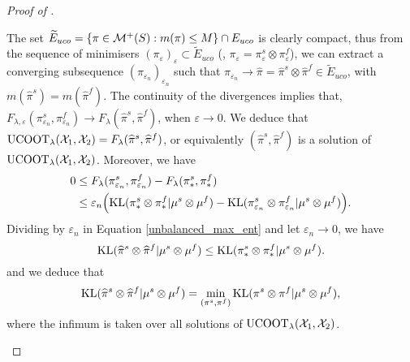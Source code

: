 \begin{proof}[Proof of ]
\begin{enumerate}
    The set $\widetilde{E}_{uco} = \{\pi \in \mathcal M^+(S): m(\pi) \leq M\} \cap E_{uco}$
    is clearly compact, thus from the sequence of minimisers
    $(\pi_{\varepsilon})_{\varepsilon} \subset \widetilde{E}_{uco}$
    (\ie, $\pi_{\varepsilon} = \pi_{\varepsilon}^s \otimes \pi_{\varepsilon}^f$), we can extract a
    converging subsequence $(\pi_{\varepsilon_n})_{\varepsilon_n}$ such that
    $\pi_{\varepsilon_n} \to \widehat{\pi} = \widehat{\pi}^s \otimes \widehat{\pi}^f \in \widetilde{E}_{uco}$,
    with $m(\widehat{\pi}^s) = m(\widehat{\pi}^f)$.
    The continuity of the divergences implies that,
    $F_{\lambda, \varepsilon}(\pi_{\varepsilon_n}^s, \pi_{\varepsilon_n}^f) \to
    F_{\lambda}(\widehat{\pi}^s, \widehat{\pi}^f)$, when $\varepsilon \to 0$. We deduce that
    $\text{UCOOT}_{\lambda}(\mathcal X_1, \mathcal X_2) = F_{\lambda}(\widehat{\pi}^s, \widehat{\pi}^f)$,
    or equivalently $(\widehat{\pi}^s, \widehat{\pi}^f)$
    is a solution of $\text{UCOOT}_{\lambda}(\mathcal X_1, \mathcal X_2)$. Moreover, we have
    \begin{equation} \label{unbalanced_max_ent}
      \begin{split}
        0 &\leq F_{\lambda}(\pi_{\varepsilon_n}^s, \pi_{\varepsilon_n}^f)
        - F_{\lambda}(\pi_*^s, \pi_*^f) \\
      &\leq \varepsilon_n \Big( \text{KL}(\pi_*^s \otimes \pi_*^f \vert \mu^s \otimes \mu^f) -
      \text{KL}(\pi_{\varepsilon_n}^s \otimes \pi_{\varepsilon_n}^f \vert \mu^s \otimes \mu^f) \Big).
      \end{split}
    \end{equation}
    Dividing by $\varepsilon_n$ in Equation \eqref{unbalanced_max_ent} and let
    $\varepsilon_n \to 0$, we have
    \begin{equation}
      \text{KL}(\widehat{\pi}^s \otimes \widehat{\pi}^f \vert \mu^s \otimes \mu^f) \leq
      \text{KL}(\pi_*^s \otimes \pi_*^f \vert \mu^s \otimes \mu^f).
    \end{equation}
    and we deduce that
    \begin{equation}
      \text{KL}(\widehat{\pi}^s \otimes \widehat{\pi}^f \vert \mu^s \otimes \mu^f) =
      \min_{(\pi^s, \pi^f)} \text{KL}(\pi^s \otimes \pi^f \vert \mu^s \otimes \mu^f),
    \end{equation}
    where the infimum is taken over all solutions of $\text{UCOOT}_{\lambda}(\mathcal X_1, \mathcal X_2)$.
  \end{enumerate}
\end{proof}


